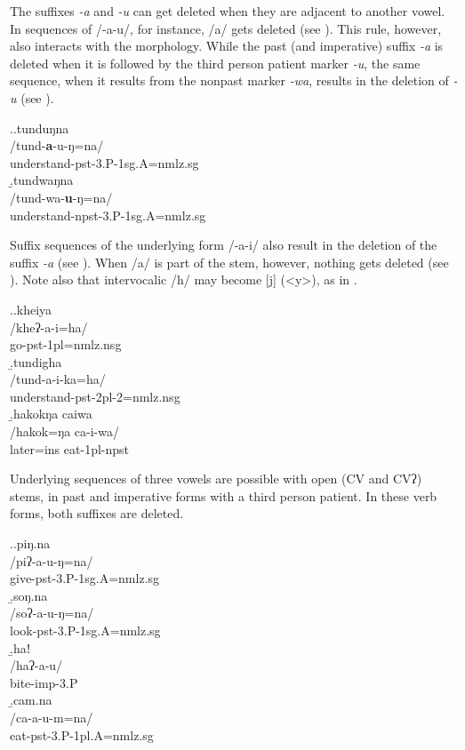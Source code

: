 The suffixes \emph{-a} and \emph{-u} can get deleted when they are adjacent to another vowel. In sequences of /-a-u/, for instance, /a/ gets deleted (see \Next[a]). This rule, however, also interacts with the morphology. While the past (and imperative) suffix \emph{-a} is deleted when it is followed by the third person patient marker \emph{-u}, the same sequence, when it results from the nonpast marker \emph{-wa}, results in the deletion of \emph{-u} (see \Next[b]).   

\ex.\a.\glll tunduŋna\\
/tund-\textbf{a}-u-ŋ=na/\\
understand{\sc -pst-3.P-1sg.A=nmlz.sg}\\
\b.\glll  tundwaŋna\\
/tund-wa-\textbf{u}-ŋ=na/\\
understand{\sc -npst-3.P-1sg.A=nmlz.sg}\\


Suffix sequences of the underlying form /-a-i/ also result in the deletion of the suffix \emph{-a} (see \Next). When /a/ is part of the stem, however, nothing gets deleted (see \Next[c]).  Note also that intervocalic /h/ may become [j] (<y>), as in \Next[a].

\ex.\a.\glll kheiya\\
/kheʔ-a-i=ha/\\
go{\sc -pst-1pl=nmlz.nsg}\\
\b.\glll  tundigha\\
/tund-a-i-ka=ha/\\
understand{\sc [3.A]-pst-2pl-2=nmlz.nsg}\\
\b.\glll hakokŋa caiwa\\
/hakok=ŋa ca-i-wa/\\
later{\sc =ins} eat{\sc -1pl-npst}\\

Underlying sequences of three vowels are possible with open (CV and CVʔ) stems, in past and imperative forms with a third person patient. In these verb forms, both suffixes are deleted. 

\ex.\a.\glll piŋ.na\\
/piʔ-a-u-ŋ=na/\\
give{\sc -pst-3.P-1sg.A=nmlz.sg}\\
\b.\glll  soŋ.na\\
/soʔ-a-u-ŋ=na/\\
look{\sc -pst-3.P-1sg.A=nmlz.sg}\\
\b.\glll  haǃ\\
/haʔ-a-u/\\
bite{\sc -imp-3.P}\\
\b.\glll  cam.na\\
/ca-a-u-m=na/\\
eat{\sc -pst-3.P-1pl.A=nmlz.sg}\\


